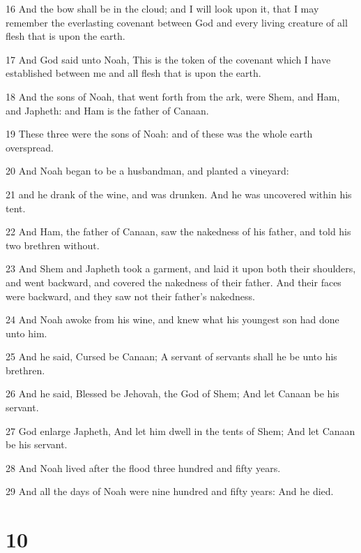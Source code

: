 \par 16 And the bow shall be in the cloud; and I will look upon it, that I may remember the everlasting covenant between God and every living creature of all flesh that is upon the earth.
\par 17 And God said unto Noah, This is the token of the covenant which I have established between me and all flesh that is upon the earth.
\par 18 And the sons of Noah, that went forth from the ark, were Shem, and Ham, and Japheth: and Ham is the father of Canaan.
\par 19 These three were the sons of Noah: and of these was the whole earth overspread.
\par 20 And Noah began to be a husbandman, and planted a vineyard:
\par 21 and he drank of the wine, and was drunken. And he was uncovered within his tent.
\par 22 And Ham, the father of Canaan, saw the nakedness of his father, and told his two brethren without.
\par 23 And Shem and Japheth took a garment, and laid it upon both their shoulders, and went backward, and covered the nakedness of their father. And their faces were backward, and they saw not their father's nakedness.
\par 24 And Noah awoke from his wine, and knew what his youngest son had done unto him.
\par 25 And he said, Cursed be Canaan; A servant of servants shall he be unto his brethren.
\par 26 And he said, Blessed be Jehovah, the God of Shem; And let Canaan be his servant.
\par 27 God enlarge Japheth, And let him dwell in the tents of Shem; And let Canaan be his servant.
\par 28 And Noah lived after the flood three hundred and fifty years.
\par 29 And all the days of Noah were nine hundred and fifty years: And he died.

\chapter{10}

